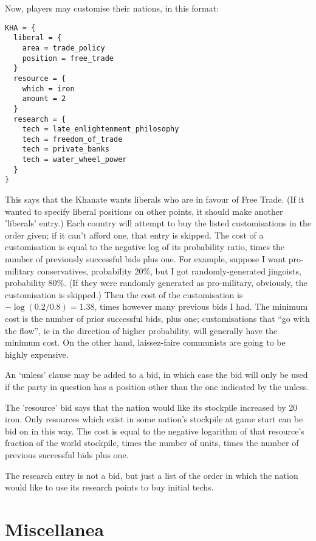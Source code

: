 \documentclass[12pt]{article}
\begin{document}
Now, players may customise their nations, in this format:
\begin{verbatim}
KHA = {
  liberal = {
    area = trade_policy
    position = free_trade 
  }
  resource = {
    which = iron
    amount = 2
  } 
  research = {
    tech = late_enlightenment_philosophy
    tech = freedom_of_trade
    tech = private_banks
    tech = water_wheel_power
  }
}
\end{verbatim}
This says that the Khanate wants liberals who are in favour of Free
Trade. (If it wanted to specify liberal positions on other points, it
should make another 'liberals' entry.) Each country will attempt to
buy the listed customisations in the order given; if it can't afford
one, that entry is skipped. The cost of a customisation is equal to
the negative log of its probability ratio, times the number of
previously successful bids plus one. For example, suppose I want
pro-military conservatives, probability 20\%, but I got
randomly-generated jingoists, probability 80\%. (If they were randomly
generated as pro-military, obviously, the customisation is skipped.)
Then the cost of the customisation is $-\log(0.2/0.8)=1.38$, times
however many previous bids I had. The minimum cost is the number of
prior successful bids, plus one; customisations that ``go with the
flow'', ie in the direction of higher probability, will generally have
the minimum cost. On the other hand, laissez-faire communists are
going to be highly expensive. 

An `unless' clause may be added to a bid, in which case the bid will
only be used if the party in question has a position other than the
one indicated by the unless. 

The 'resource' bid says that the nation would like its stockpile
increased by 20 iron. Only resources which exist in some nation's
stockpile at game start can be bid on in this way. The cost is equal
to the negative logarithm of that resource's fraction of the world
stockpile, times the number of units, times the number of previous
successful bids plus one. 

The research entry is not a bid, but just a list of the order in which
the nation would like to use its research points to buy initial
techs. 

\section{Miscellanea} 
\end{document}
